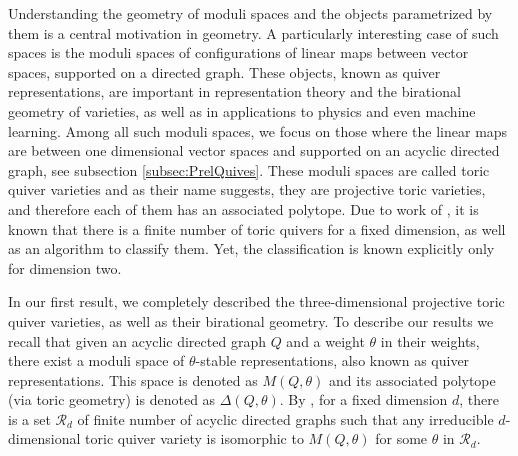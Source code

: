 \documentclass[11pt]{amsart}
\theoremstyle{plain}
\theoremstyle{definition}
\begin{document}
Understanding the geometry of moduli spaces and the objects parametrized by them is a central motivation in geometry. A particularly interesting case of such spaces is the moduli spaces of configurations of linear maps between vector spaces, supported on a directed graph. These objects, known as quiver representations, are important in representation theory and the birational geometry of varieties, as well as in applications to physics and even machine learning. Among all such moduli spaces, we focus on those where the linear maps are between one dimensional vector spaces and supported on an acyclic directed graph, see  subsection \ref{subsec:PrelQuives}.
These moduli spaces are called toric quiver varieties
and as their name suggests, they are projective toric varieties, and therefore each of them has an associated polytope. Due to work of \cite{domokos2016equations, altmann2009flow},  it is known that there is a finite number of toric quivers for a fixed dimension, as well as an algorithm to classify them. Yet, the classification is known explicitly only for dimension two.

In our first result, we completely described the three-dimensional projective toric quiver varieties, as well as their birational geometry. To describe our results we recall that given an acyclic directed graph $Q$ and a weight $\theta$ in their weights, there exist a moduli space of $\theta$-stable representations, also known as quiver representations.  This space is denoted as 
$M(Q, \theta)$ and its associated polytope (via toric geometry) is denoted as $\Delta(Q,\theta)$. By  \cite[Thm 4.22]{domokos2016equations}, 
for a fixed  dimension $d$, there is a set $\mathcal{R}_d$ of finite number of acyclic directed graphs such that any irreducible $d$-dimensional toric quiver variety is isomorphic to 
$M(Q, \theta)$ for some $\theta$ in $\mathcal{R}_d$.
\end{document}
